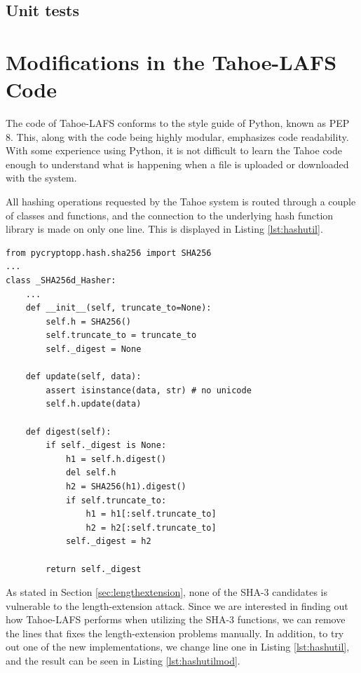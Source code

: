 \documentclass[english,12pt,a4paper]{book}
\begin{document}
\subsection{Unit tests}

\section{Modifications in the Tahoe-\ac{LAFS} Code}

The code of Tahoe-LAFS conforms to the style guide of Python, known as PEP 8.
This, along with the code being highly modular, emphasizes code readability.
With some experience using Python, it is not difficult to learn the Tahoe code
enough to understand what is happening when a file is uploaded or downloaded
with the system.

All hashing operations requested by the Tahoe system is routed through a
couple of classes and functions, and the connection to the underlying hash
function library is made on only one line. This is displayed in Listing
\ref{lst:hashutil}.

\begin{lstlisting}[label=lst:hashutil, caption=Extract from hashutil.py of Tahoe-LAFS source.]
from pycryptopp.hash.sha256 import SHA256
...
class _SHA256d_Hasher:
    ...
    def __init__(self, truncate_to=None):
        self.h = SHA256()
        self.truncate_to = truncate_to
        self._digest = None

    def update(self, data):
        assert isinstance(data, str) # no unicode
        self.h.update(data)

    def digest(self):
        if self._digest is None:
            h1 = self.h.digest()
            del self.h
            h2 = SHA256(h1).digest()
            if self.truncate_to:
                h1 = h1[:self.truncate_to]
                h2 = h2[:self.truncate_to]
            self._digest = h2

        return self._digest
\end{lstlisting}

As stated in Section \ref{sec:lengthextension}, none of the SHA-3 candidates is
vulnerable to the length-extension attack. Since we are interested in finding
out how Tahoe-\ac{LAFS} performs when utilizing the SHA-3 functions, we can
remove the lines that fixes the length-extension problems manually. In addition,
to try out one of the new implementations, we change line one in Listing
\ref{lst:hashutil}, and the result can be seen in Listing \ref{lst:hashutilmod}.
\end{document}

